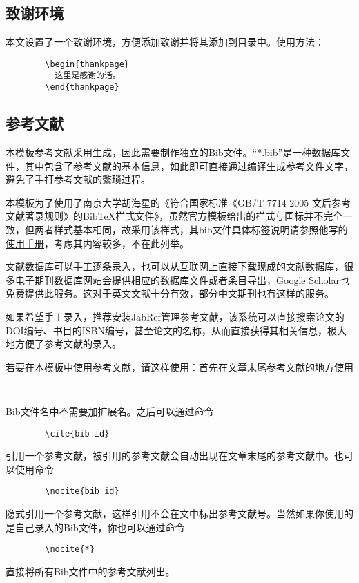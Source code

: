 \documentclass[UTF8,sub3section]{ctexart}
\begin{document}
	\subsection{致谢环境}
	本文设置了一个致谢环境，方便添加致谢并将其添加到目录中。使用方法：
	\begin{verbatim}
		\begin{thankpage}
		  这里是感谢的话。
		\end{thankpage}
	\end{verbatim}
	
	\subsection{参考文献}
	本模板参考文献采用\BibTeX 生成，因此需要制作独立的Bib文件。“*.bib”是一种数据库文件，其中包含了参考文献的基本信息，如此即可直接通过编译生成参考文件文字，避免了手打参考文献的繁琐过程。
	
	本模板为了使用了南京大学胡海星的《符合国家标准《GB/T 7714-2005 文后参考文献著录规则》的BibTeX样式文件》，虽然官方模板给出的样式与国标并不完全一致，但两者样式基本相同，故采用该样式，其bib文件具体标签说明请参照他写的\href{https://raw.github.com/Haixing-Hu/nju-thesis/master/manual/njuthesis-manual.pdf}{使用手册}\cite{nanda}，考虑其内容较多，不在此列举。
	
	文献数据库可以手工逐条录入，也可以从互联网上直接下载现成的文献数据库，很多电子期刊数据库网站会提供相应的\BibTeX 数据库文件或者\BibTeX 条目导出，Google\textsuperscript{\textregistered}  Scholar也免费提供此服务。\cite[\S 3.3]{9787121202087}这对于英文文献十分有效，部分中文期刊也有这样的服务。
	
	如果希望手工录入，推荐安装JabRef管理参考文献，该系统可以直接搜索论文的DOI编号、书目的ISBN编号，甚至论文的名称，从而直接获得其相关信息，极大地方便了参考文献的录入。
	
	若要在本模板中使用参考文献，请这样使用：首先在文章末尾参考文献的地方使用
	\begin{verbatim}
		
	\end{verbatim}
	Bib文件名中不需要加扩展名。之后可以通过命令
	\begin{verbatim}
		\cite{bib id}
	\end{verbatim}
	引用一个参考文献，被引用的参考文献会自动出现在文章末尾的参考文献中。也可以使用命令
	\begin{verbatim}
		\nocite{bib id}
	\end{verbatim}
	隐式引用一个参考文献，这样引用不会在文中标出参考文献号。当然如果你使用的是自己录入的Bib文件，你也可以通过命令
	\begin{verbatim}
		\nocite{*}
	\end{verbatim}
	直接将所有Bib文件中的参考文献列出。
	
\end{document}
